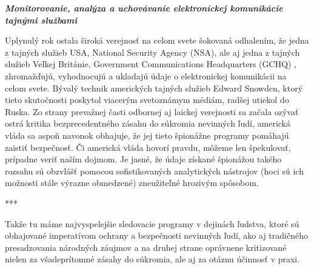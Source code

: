 \documentclass{article}
\begin{document}
\pagebreak
\begin{center}
\Huge
\textbf{\textit{Monitorovanie, analýza a uchovávanie elektronickej komunikácie tajnými službami}}
\normalsize
\end{center}

\bigskip

\setlength{\parindent}{1,25cm}

Uplynulý rok ostala široká verejnosť na celom svete šokovaná odhalením, že jedna z tajných služieb USA, National Security Agency \cite{nsa} (NSA), ale aj jedna z tajných služieb Veľkej Británie, Government Communications Headquarters (GCHQ) \cite{gchq}, zhromažďujú, vyhodnocujú a ukladajú údaje o elektronickej komunikácii na celom svete. Bývalý technik amerických tajných služieb Edward Snowden, ktorý tieto skutočnosti poskytol viacerým svetoznámym médiám, radšej utiekol do Ruska. Zo strany prevažnej časti odbornej aj laickej verejnosti sa začala ozývať ostrá kritika bezprecedentného zásahu do súkromia nevinných ľudí, americká vláda sa aspoň navonok obhajuje, že jej tieto špionážne programy pomáhajú zaistiť bezpečnosť. Či americká vláda hovorí pravdu, môžeme len špekulovať, prípadne veriť naším dojmom. Je jasné, že údaje získané špionážou takého rozsahu sú obzvlášť pomocou sofistikovaných analytických nástrojov (hoci sú ich možnosti stále výrazne obmedzené) zneužiteľné hrozivým spôsobom.

\begin{center}
***
\end{center}

Takže tu máme najvyspelejšie sledovacie programy v dejinách ľudstva, ktoré sú obhajované imperatívom ochrany a bezpečnosti nevinných ľudí, ako aj tradičného presadzovania národných záujmov a na druhej strane oprávnene kritizované nielen za všadeprítomné zásahy do súkromia, ale aj za otáznu účinnosť v praxi.

\smallskip
\end{document}

